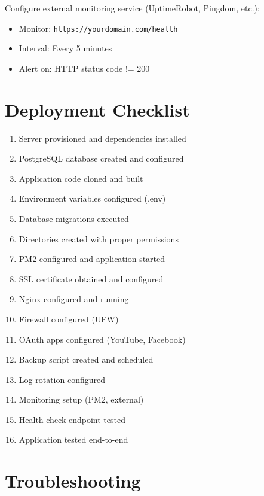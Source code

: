 Configure external monitoring service (UptimeRobot, Pingdom, etc.):

\begin{itemize}
    \item Monitor: \texttt{https://yourdomain.com/health}
    \item Interval: Every 5 minutes
    \item Alert on: HTTP status code != 200
\end{itemize}

\section{Deployment Checklist}

\begin{enumerate}
    \item[$\square$] Server provisioned and dependencies installed
    \item[$\square$] PostgreSQL database created and configured
    \item[$\square$] Application code cloned and built
    \item[$\square$] Environment variables configured (.env)
    \item[$\square$] Database migrations executed
    \item[$\square$] Directories created with proper permissions
    \item[$\square$] PM2 configured and application started
    \item[$\square$] SSL certificate obtained and configured
    \item[$\square$] Nginx configured and running
    \item[$\square$] Firewall configured (UFW)
    \item[$\square$] OAuth apps configured (YouTube, Facebook)
    \item[$\square$] Backup script created and scheduled
    \item[$\square$] Log rotation configured
    \item[$\square$] Monitoring setup (PM2, external)
    \item[$\square$] Health check endpoint tested
    \item[$\square$] Application tested end-to-end
\end{enumerate}

\section{Troubleshooting}

